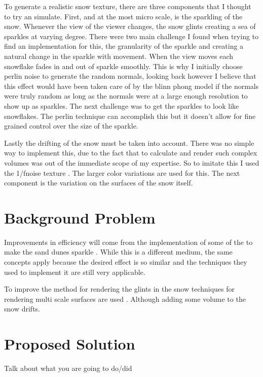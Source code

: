 \documentclass{IEEEtran}
\begin{document}
To generate a realistic snow texture, there are three components that I thought
to try an simulate.  First, and at the most micro scale, is the sparkling of the
snow. Whenever the view of the viewer changes, the snow glints creating a sea of
sparkles at varying degree. There were two main challenge I found when trying to
find an implementation for this, the granularity of the sparkle and creating a
natural change in the sparkle with movement.  When the view moves each snowflake
fades in and out of sparkle smoothly.  This is why I initially choose perlin
noise to generate the random normals, looking back however I believe that this
effect would have been taken care of by the blinn phong model if the normals
were truly random as long as the normals were at a large enough resolution to
show up as sparkles. The next challenge was to get the sparkles to look like
snowflakes.  The perlin technique can accomplish this but it doesn't allow for
fine grained control over the size of the sparkle.

Lastly the drifting of the snow must be taken into account. There was no simple
way to implement this, due to the fact that to calculate and render such complex
volumes was out of the immediate scope of my expertise. So to imitate this I
used the 1/fnoise texture . The larger color variations
are used for this. The next component is the variation on the surfaces of the
snow itself.


\section{Background Problem}

Improvements in efficiency will come from the implementation of some of the to
make the sand dunes sparkle \cite{journey}. While this is a different medium,
the same concepts apply because the desired effect is so similar and the
techniques they used to implement it are still very applicable.

To improve the method for rendering the glints in the snow techniques for
rendering multi scale surfaces are used \cite{multiscale}. Although adding some
volume to the snow drifts.


\section{Proposed Solution}

Talk about what you are going to do/did



\end{document}
